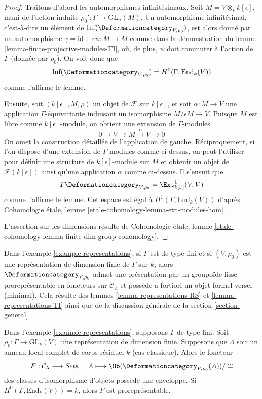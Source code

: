 \begin{proof}
Traitons d'abord les automorphismes infinitésimaux.
Soit $M = V \otimes_k k[\epsilon]$, muni de l'action induite
$\rho_0' : \Gamma \to \text{GL}_n(M)$.
Un automorphisme infinitésimal, c'est-à-dire un élément de
$\text{Inf}(\Deformationcategory_{V, \rho_0})$,
est alors donné par un automorphisme
$\gamma = \text{id} + \epsilon \psi : M \to M$
comme dans la démonstration du lemme \ref{lemma-finite-projective-modules-TI},
où, de plus, $\psi$ doit commuter
à l'action de $\Gamma$ (donnée par $\rho_0$).
On voit donc que
$$
\text{Inf}(\Deformationcategory_{V, \rho_0}) = H^0(\Gamma, \text{End}_k(V))
$$
comme l'affirme le lemme.

\medskip\noindent
Ensuite, soit $(k[\epsilon], M, \rho)$ un objet de $\mathcal{F}$
sur $k[\epsilon]$, et soit $\alpha : M \to V$ une application $\Gamma$-équivariante
induisant un isomorphisme $M/\epsilon M \to V$.
Puisque $M$ est libre comme $k[\epsilon]$-module, on obtient
une extension de $\Gamma$-modules
$$
0 \to V \to M \xrightarrow{\alpha} V \to 0
$$
On omet la construction détaillée de l'application de gauche.
Réciproquement, si l'on dispose d'une extension de $\Gamma$-modules comme
ci-dessus, on peut l'utiliser pour définir une structure de $k[\epsilon]$-module
sur $M$ et obtenir un objet de $\mathcal{F}(k[\epsilon])$
ainsi qu'une application $\alpha$ comme ci-dessus.
Il s'ensuit que
$$
T\Deformationcategory_{V, \rho_0} = \Ext^1_{k[\Gamma]}(V, V)
$$
comme l'affirme le lemme. Cet espace est égal à
$H^1(\Gamma, \text{End}_k(V))$ d'après Cohomologie étale,
lemme \ref{etale-cohomology-lemma-ext-modules-hom}.

\medskip\noindent
L'assertion sur les dimensions résulte de Cohomologie étale,
lemme
\ref{etale-cohomology-lemma-finite-dim-group-cohomology}.
\end{proof}

\noindent
Dans l'exemple \ref{example-representations}, si $\Gamma$ est de type fini
et si $(V, \rho_0)$ est une représentation de dimension finie de $\Gamma$
sur $k$, alors $\Deformationcategory_{V, \rho_0}$
admet une présentation par un groupoïde lisse proreprésentable en foncteurs
sur $\mathcal{C}_\Lambda$
et possède a fortiori un objet formel versel (minimal). Cela résulte
des lemmes \ref{lemma-representations-RS} et \ref{lemma-representations-TI}
ainsi que de la discussion générale de la section \ref{section-general}.

\begin{lemma}
\label{lemma-representations-hull}
Dans l'exemple \ref{example-representations}, supposons $\Gamma$ de type fini.
Soit $\rho_0 : \Gamma \to \text{GL}_k(V)$ une représentation de dimension finie.
Supposons que $\Lambda$ soit un anneau local complet de corps résiduel $k$
(cas classique). Alors le foncteur
$$
F : \mathcal{C}_\Lambda \longrightarrow \textit{Sets},\quad
A \longmapsto \Ob(\Deformationcategory_{V, \rho_0}(A))/\cong
$$
des classes d'isomorphisme d'objets possède une enveloppe. Si
$H^0(\Gamma, \text{End}_k(V)) = k$, alors $F$ est
proreprésentable.
\end{lemma}

